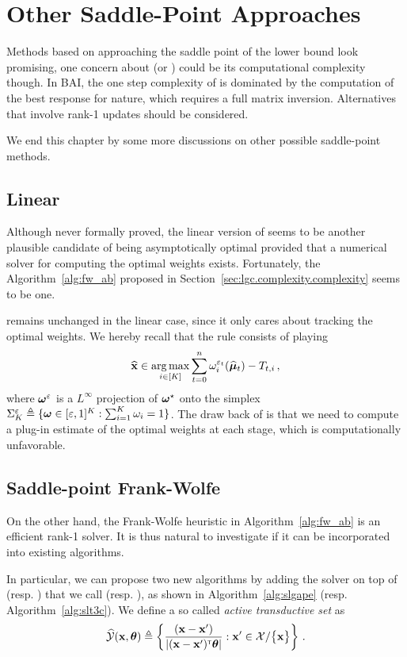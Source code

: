 \section{Other Saddle-Point Approaches}\label{sec:lgc.sp}

Methods based on approaching the saddle point of the lower bound look promising, one concern about \LG{} (or \LGC{}) could be its computational complexity though. In BAI, the one step complexity of \LG{} is dominated by the computation of the best response for nature, which requires a full matrix inversion. Alternatives that involve rank-1 updates should be considered.

We end this chapter by some more discussions on other possible saddle-point methods.

\subsection{Linear \texorpdfstring{\Track{}}{}}

Although never formally proved, the linear version of \Track seems to be another plausible candidate of being asymptotically optimal provided that a numerical solver for computing the optimal weights exists. Fortunately, the Algorithm~\ref{alg:fw_ab} proposed in Section~\ref{sec:lgc.complexity.complexity} seems to be one. 

\Track remains unchanged in the linear case, since it only cares about tracking the optimal weights. We hereby recall that the \CT rule consists of playing
\[
    \widehat{{\bf x}} \in \operatorname*{arg\,max}_{i\in[K]} \sum_{t=0}^n \omega_i^{\varepsilon_t}(\widehat{{\boldsymbol \mu}}_t)-T_{t,i}\,,
\]
where ${\boldsymbol \omega}^\varepsilon$ is a $L^\infty$ projection of ${\boldsymbol \omega}^\star$ onto the simplex $\Sigma_K^\varepsilon \triangleq \{{\boldsymbol \omega}\in [\varepsilon,1]^K : \sum_{i=1}^K \omega_i = 1\}$. The draw back of \Track is that we need to compute a plug-in estimate of the optimal weights at each stage, which is computationally unfavorable.

\subsection{Saddle-point Frank-Wolfe}
On the other hand, the Frank-Wolfe heuristic in Algorithm~\ref{alg:fw_ab} is an efficient rank-1 solver. It is thus natural to investigate if it can be incorporated into existing algorithms. 

In particular, we can propose two new algorithms by adding the solver on top of \LGapE (resp. \LTCC) that we call \SLGapE (resp. \SLTCC), as shown in Algorithm~\ref{alg:slgape} (resp. Algorithm~\ref{alg:slt3c}). We define a so called \emph{active transductive set} as
\begin{align}\label{def:active_transductive}
    \widehat{\mathcal{Y}}({\bf x},{\boldsymbol \theta}) \triangleq \left\{ \frac{({\bf x}- {\bf x}')}{\left|({\bf x}-{\bf x}')^\mathsf{\scriptscriptstyle T}{\boldsymbol \theta}\right|}: {\bf x}'\in\mathcal{X}/\big\{{\bf x}\big\}  \right\}\,.
\end{align}


